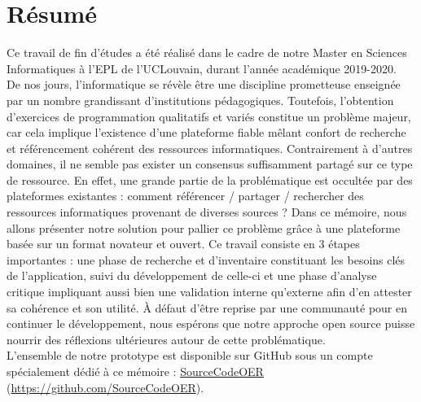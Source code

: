 \chapter*{Résumé}

Ce travail de fin d'études a été réalisé dans le cadre de notre Master en Sciences Informatiques à l'EPL de l'UCLouvain, durant l'année académique 2019-2020.\\

De nos jours, l’informatique se révèle être une discipline prometteuse enseignée par un nombre grandissant d’institutions pédagogiques.
Toutefois, l'obtention d’exercices de programmation qualitatifs et variés constitue un problème majeur, car cela implique l'existence d'une plateforme fiable mêlant confort de recherche et référencement cohérent des ressources informatiques.
Contrairement à d'autres domaines, il ne semble pas exister un consensus suffisamment partagé sur ce type de ressource. En effet, une grande partie de la problématique est occultée par des plateformes existantes : comment référencer / partager / rechercher des ressources informatiques provenant de diverses sources ?
Dans ce mémoire, nous allons présenter notre solution pour pallier ce problème grâce à une plateforme basée sur un format novateur et ouvert.
Ce travail consiste en 3 étapes importantes : une phase de recherche et d'inventaire constituant les besoins clés de l'application, suivi du développement de celle-ci et une phase d'analyse critique impliquant aussi bien une validation interne qu'externe afin d'en attester sa cohérence et son utilité.
À défaut d'être reprise par une communauté pour en continuer le développement, nous espérons que notre approche open source puisse nourrir des réflexions ultérieures autour de cette problématique.\\

L'ensemble de notre prototype est disponible sur GitHub sous un compte spécialement dédié à ce mémoire : 
\href{https://github.com/SourceCodeOER}{SourceCodeOER} (\href{https://github.com/SourceCodeOER}{https://github.com/SourceCodeOER}).

\iffalse

